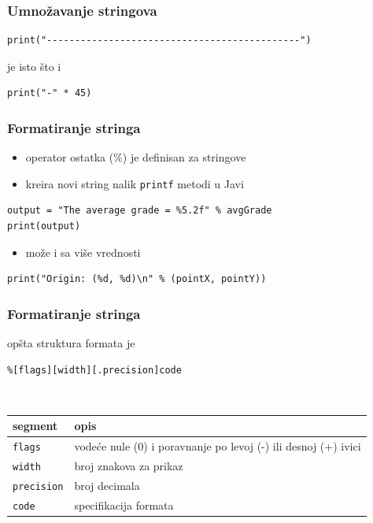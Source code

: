 \documentclass[compress]{beamer}
\begin{document}
\begin{frame}[fragile]
\frametitle{Umnožavanje stringova}
\begin{verbatim}
print("---------------------------------------------")
\end{verbatim}

je isto što i

\begin{verbatim}
print("-" * 45)
\end{verbatim}
\end{frame}

\begin{frame}[fragile]
\frametitle{Formatiranje stringa}
\begin{itemize}
  \item operator ostatka (\%) je definisan za stringove
  \item kreira novi string nalik \texttt{printf} metodi u Javi
\end{itemize}
\begin{verbatim}
output = "The average grade = %5.2f" % avgGrade
print(output)
\end{verbatim}
\begin{itemize}
  \item može i sa više vrednosti
\end{itemize}
\begin{verbatim}
print("Origin: (%d, %d)\n" % (pointX, pointY))
\end{verbatim}
\end{frame}

\begin{frame}[fragile]
\frametitle{Formatiranje stringa}
opšta struktura formata je
\begin{verbatim}
%[flags][width][.precision]code
\end{verbatim}

\ %

\begin{tabular}{lp{7cm}}
  \textbf{segment} & \textbf{opis} \\ \hline
  \texttt{flags} & vodeće nule (0) i poravnanje po levoj (-) ili desnoj (+) ivici \\ \hline
  \texttt{width} & broj znakova za prikaz \\ \hline
  \texttt{precision} & broj decimala \\ \hline
  \texttt{code} & specifikacija formata
\end{tabular}
\end{frame}
\end{document}
